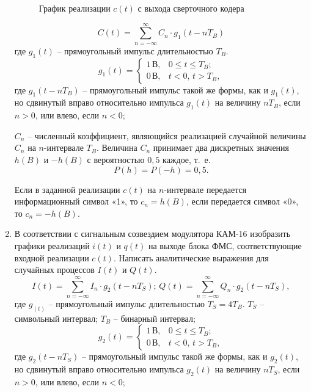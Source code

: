 \documentclass[a4paper, 12pt]{article}
\begin{document}
\begin{enumerate}
\begin{figure}[H]
    \caption{График реализации $c(t)$ с выхода сверточного кодера}
  \end{figure}

  \[ C(t)=\sum^\infty_{n=-\infty}C_n\cdot g_1(t-nT_B) \]
  где $g_1(t)$ -- прямоугольный импульс длительностью $T_B$.
  \[ g_1(t)=\begin{cases}
    1\,В, & 0\leq t \leq T_B;\\
    0\,В, & t<0,\,t>T_B,
  \end{cases} \]
  где $g_1(t-nT_B)$ -- прямоугольный импульс такой же формы, 
  как и $g_1(t)$, но сдвинутый вправо относительно импульса 
  $g_1(t)$ на величину $nT_B$, если $n>0$, или 
  влево, если $n<0$; 
  
  $C_n$ -- численный коэффициент, являющийся реализацией 
  случайной величины $C_n$ на $n$-интервале $T_B$.
  Величина $C_n$ принимает два дискретных значения $h(B)$ и 
  $-h(B)$ с вероятностью $0,5$ каждое, \mbox{т. е.} 
  \[ P(h)=P(-h)=0,5. \]

  Если в заданной реализации $c(t)$ на $n$-интервале передается 
  информационный символ «1», то $c_n=h(B)$, 
  если передается символ «0», то $c_n=-h(B)$.

  \item В соответствии с сигнальным созвездием модулятора КАМ-16 
  изобразить графики реализаций $i(t)$ и $q(t)$ на выходе 
  блока ФМС, соответствующие входной реализации $c(t)$. 
  Написать аналитические выражения для случайных процессов 
  $I(t)$ и $Q(t)$.
  \[ I(t)=\sum^\infty_{n=-\infty}I_n\cdot g_2(t-nT_S);\,
  Q(t)=\sum^\infty_{n=-\infty}Q_n\cdot g_2(t-nT_S), \]
  где $g_(t)$ -- прямоугольный импульс длительностью 
  $T_S=4T_B$. $T_S$ -- символьный интервал; 
  $T_B$ -- бинарный интервал;
  \[ g_2(t)=\begin{cases}
    1\,В, & 0\leq t \leq T_B;\\
    0\,В, & t<0,\,t>T_B,
  \end{cases} \]
  где $g_2(t-nT_S)$ -- прямоугольный импульс такой же формы, 
  как и $g_2(t)$, но сдвинутый вправо относительно импульса 
  $g_2(t)$ на величину $nT_S$, если $n>0$, или 
  влево, если $n<0$;
  

\end{enumerate}
\end{document}
